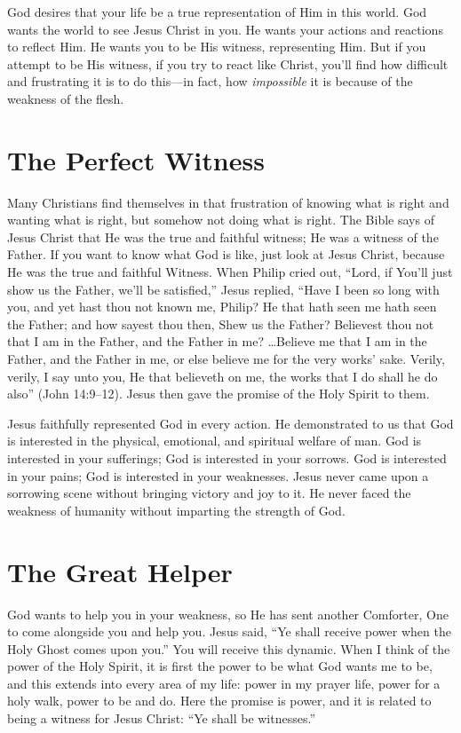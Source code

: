 God desires that your life be a true representation of
Him in this world. God wants the world to see Jesus Christ
in you. He wants your actions and reactions to reflect Him.
He wants you to be His witness, representing Him. But if
you attempt to be His witness, if you try to react like Christ,
you’ll find how difficult and frustrating it is to do this—in
fact, how \emph{impossible} it is because of the weakness of the
flesh.


\section*{The Perfect Witness}

Many Christians find themselves in that frustration of
knowing what is right and wanting what is right, but somehow
not doing what is right. The Bible says of Jesus Christ
that He was the true and faithful witness; He was a witness
of the Father. If you want to know what God is like, just look
at Jesus Christ, because He was the true and faithful Witness.
When Philip cried out, “Lord, if You’ll just show us
the Father, we’ll be satisfied,” Jesus replied, “Have I been so
long with you, and yet hast thou not known me, Philip? He
that hath seen me hath seen the Father; and how sayest thou
then, Shew us the Father? Believest thou not that I am in the
Father, and the Father in me? …Believe me that I am in the
Father, and the Father in me, or else believe me for the very
works’ sake. Verily, verily, I say unto you, He that believeth
on me, the works that I do shall he do also” (John 14:9–12).
Jesus then gave the promise of the Holy Spirit to them.

Jesus faithfully represented God in every action. He
demonstrated to us that God is interested in the physical,
emotional, and spiritual welfare of man. God is interested
in your sufferings; God is interested in your sorrows. God
is interested in your pains; God is interested in your weaknesses.
Jesus never came upon a sorrowing scene without
bringing victory and joy to it. He never faced the weakness
of humanity without imparting the strength of God.


\section*{The Great Helper}

God wants to help you in your weakness, so He has
sent another Comforter, One to come alongside you and
help you. Jesus said, “Ye shall receive power when the Holy
Ghost comes upon you.” You will receive this dynamic.
When I think of the power of the Holy Spirit, it is first the
power to be what God wants me to be, and this extends into
every area of my life: power in my prayer life, power for a
holy walk, power to be and do. Here the promise is power,
and it is related to being a witness for Jesus Christ: “Ye shall
be witnesses.”

